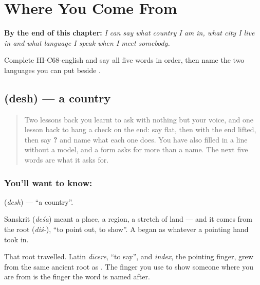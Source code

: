 
\chapter{Where You Come From}
\label{ch:hi-where-you-come-from}

\begin{chapteropening}
\textbf{By the end of this chapter:} \emph{I can say what country I am in, what city I live in and what language I speak when I meet somebody.}

Complete HI-C68-english and say all five words in order, then name the two languages you can put beside .
\end{chapteropening}

\section[\texorpdfstring{\hi{देश} (desh)}{देश (desh)}]{ (desh) — a country}

\label{lesson:HI-C68-country}



\begin{quote}
Two lessons back you learnt to ask with nothing but your voice, and one lesson back to hang a check on the end: say \textbf{  } flat, then with the end lifted, then say \textbf{   ?} and name what each one does. You have also filled in a  line without a model, and a form asks for more than a name. The next five words are what it asks for.
\end{quote}

\subsection*{You'll want to know: }
\textbf{} (\emph{desh}) — \textquotedblleft{}a country\textquotedblright{}.

Sanskrit  (\emph{deśa}) meant a place, a region, a stretch of land — and it comes from the root  (\emph{diś-}), \textquotedblleft{}to point out, to show\textquotedblright{}. A  began as whatever a pointing hand took in.

That root travelled. Latin \emph{dīcere}, \textquotedblleft{}to say\textquotedblright{}, and \emph{index}, the pointing finger, grew from the same ancient root as . The finger you use to show someone where you are from is the finger the word is named after.

